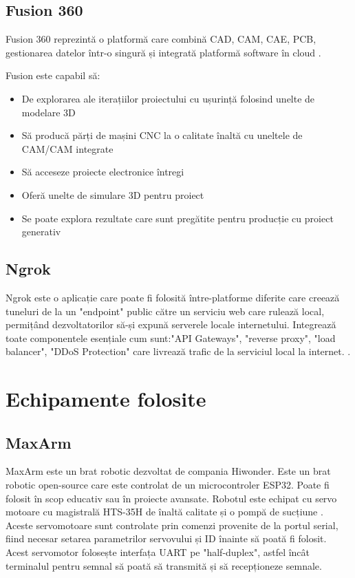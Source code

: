 \subsection{Fusion 360}


Fusion 360 reprezintă o platformă care combină CAD, CAM, CAE, PCB, gestionarea datelor într-o singură și integrată platformă software în cloud \cite{Fusion}.

Fusion este capabil să:
\begin{itemize}
	\item De explorarea ale iterațiilor  proiectului cu ușurință folosind unelte de modelare 3D \cite{Fusion}
	\item Să producă părți de mașini CNC la o calitate înaltă cu uneltele de CAM/CAM integrate \cite{Fusion}
	\item Să acceseze proiecte electronice întregi \cite{Fusion}
	\item Oferă unelte de simulare 3D pentru proiect \cite{Fusion}
	\item Se poate explora rezultate care sunt pregătite pentru producție cu proiect generativ  \cite{Fusion}
\end{itemize}
\subsection{Ngrok}
Ngrok este o aplicație care poate fi folosită între-platforme diferite care creează tuneluri de la un "endpoint" public către un serviciu web care rulează local, permițând dezvoltatorilor să-și expună serverele locale internetului. Integrează toate componentele esențiale cum sunt:"API Gateways", "reverse proxy", "load balancer", "DDoS Protection" care livrează trafic de la serviciul local la internet. \cite{Ngrok}.


\newpage
\section{Echipamente folosite}

\subsection{MaxArm}

MaxArm este un brat robotic dezvoltat de compania Hiwonder. Este un brat robotic open-source care este controlat de un microcontroler ESP32. Poate fi folosit în scop educativ sau în proiecte avansate. Robotul este echipat cu servo motoare cu magistrală HTS-35H de înaltă calitate și o pompă de sucțiune \cite{MaxArm}. 
Aceste servomotoare sunt controlate prin comenzi provenite de la portul serial, fiind necesar setarea parametrilor servovului și ID înainte să poată fi folosit. Acest servomotor folosește interfața UART pe "half-duplex", astfel încât terminalul pentru semnal să poată să transmită și să recepționeze semnale. 

